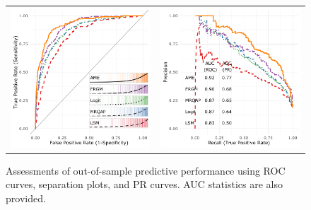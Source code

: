 \begin{figure}[ht]
	\centering
	\caption{Assessments of out-of-sample predictive performance using ROC curves, separation plots, and PR curves. AUC statistics are also provided.}
	\begin{tabular}{cc}
	\includegraphics[width=.5\textwidth]{roc_outSample} & 
	\includegraphics[width=.5\textwidth]{rocPr_outSample}	
	\end{tabular}
	\label{fig:roc}
\end{figure}

